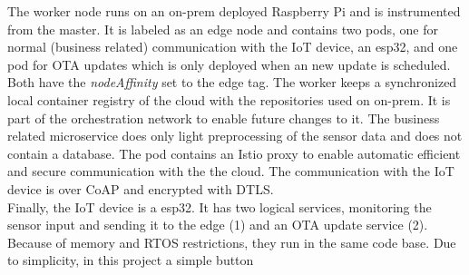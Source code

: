 The worker node runs on an on-prem deployed Raspberry Pi and is instrumented from the master. It is labeled as an edge node and contains two pods, one for normal (business related) communication with the IoT device, an esp32, and one pod for OTA updates which is only deployed when an new update is scheduled. Both have the \textit{nodeAffinity} set to the edge tag. The worker keeps a synchronized local container registry of the cloud with the repositories used on on-prem. It is part of the orchestration network to enable future changes to it. The business related microservice does only light preprocessing of the sensor data and does not contain a database. The pod contains an Istio proxy to enable automatic efficient and secure communication with the the cloud. The communication with the IoT device is over CoAP and encrypted with DTLS. \\
Finally, the IoT device is a esp32. It has two logical services, monitoring the sensor input and sending it to the edge (1) and an OTA update service (2). Because of memory and RTOS restrictions, they run in the same code base. Due to simplicity, in this project a simple button 
